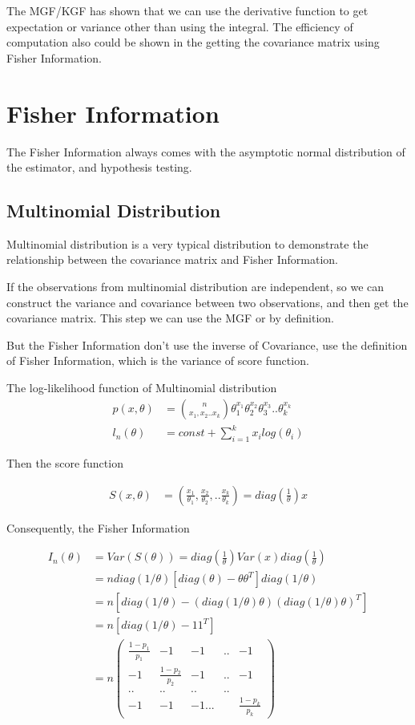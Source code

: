 The MGF/KGF has shown that we can use the derivative function to get expectation or variance other than using the integral. The efficiency of computation also could be shown in the getting the covariance matrix using Fisher Information.


\section{Fisher Information}

The Fisher Information always comes with the asymptotic normal distribution of the estimator, and hypothesis testing.

\subsection{Multinomial Distribution}
Multinomial distribution is a very typical distribution to demonstrate the relationship between the covariance matrix and Fisher Information.

If the observations from multinomial distribution are independent, so we can construct the variance and covariance between two observations, and then get the covariance matrix. This step we can use the MGF or by definition.

But the Fisher Information don't use the inverse of Covariance, use the definition of Fisher Information, which is the variance of score function.

The log-likelihood function of Multinomial distribution 
\begin{align*}
	p(x, \theta) &= {n \choose x_1, x_2.. x_k} \theta_1^{x_1} \theta_2^{x_2} \theta_3^{x_3}.. \theta_k^{x_k} \\
	l_n(\theta) &= const + \sum_{i=1}^k x_i log(\theta_i)
\end{align*}

Then the score function

\begin{align*}
	S(x, \theta) &= \left(\frac{x_1}{\theta_1}, \frac{x_2}{\theta_2},.. \frac{x_k}{\theta_k} \right) = diag(\frac{1}{\theta}) x
\end{align*}

Consequently, the Fisher Information

\begin{align*}
	I_n(\theta) &= Var(S(\theta)) = diag(\frac{1}{\theta}) Var(x) diag(\frac{1}{\theta})\\
	&= n diag(1/\theta) [diag(\theta) - \theta \theta^T] diag(1/\theta)\\
	&= n \left[ diag(1/\theta) - (diag(1/\theta) \theta) (diag(1/\theta) \theta)^T  \right]\\
	&= n \left[ diag(1/\theta) - 11^T  \right]\\
	&= n \begin{pmatrix}
		\frac{1-p_1}{p_1} & -1 & -1 &.. & -1 \\
		-1 & \frac{1-p_2}{p_2} & -1 &.. &-1 \\
		..&..&..&..& \\
		-1 & -1 & -1... & & \frac{1-p_k}{p_k}
	\end{pmatrix}
\end{align*}



